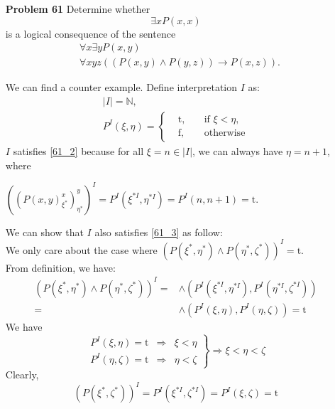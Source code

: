 \begin{enumerate}
\item[\textbf{Problem 61}]  Determine whether 
\begin{equation}
      \label{61_1}
      \exists x P(x, x) 
\end{equation}
is a logical consequence of the sentence 
\begin{eqnarray}
       \label{61_2}
       &\forall x \exists y P(x, y)\\
       \label{61_3}
       & \forall xyz((P(x, y) \wedge P(y,z)) \rightarrow P(x, z)). 
\end{eqnarray}

$~$\\
We can find a counter example. Define interpretation $I$ as:
\begin{equation*}
\begin{gathered}
|I| = \mathbb{N}, \\
P^I(\xi, \eta) = 
\left\{
        \begin{array}{ccc}      
        &\mathrm{t}, \quad &\text{if }  \xi < \eta, \\
        &\mathrm{f}, \quad &\text{otherwise}
        \end{array}\right.     
\end{gathered}
\end{equation*} 
$I$ satisfies \eqref{61_2} because for all $\xi = n \in |I|$, we can always have $\eta = n + 1$, where \begin{center}
$((P(x, y)_{\xi^*}^x)_{\eta^*}^y)^I  = P^I(\xi^{*I}, \eta^{*I}) = P^I(n, n + 1) = \mathrm{t}$. 
\end{center}

We can show that $I$ also satisfies \eqref{61_3} as follow: \\
We only care about the case where 
$(P(\xi^*, \eta^*) \wedge P(\eta^*, \zeta^*))^I = \mathrm{t}$. \\
From definition, we have:
\begin{eqnarray*}
(P(\xi^*, \eta^*) \wedge P(\eta^*, \zeta^*))^I  
                           = & \wedge (P^I(\xi^{*I}, \eta^{*I}),  P^I(\eta^{*I}, \zeta^{*I}))\\
                           =  & \wedge (P^I(\xi, \eta),  P^I(\eta, \zeta)) = \mathrm{t}
\end{eqnarray*}
We have
\begin{equation*}
\left.
        \begin{array}{ccc}      
        P^I(\xi, \eta) = \mathrm{t} &  \Rightarrow  &  \xi < \eta  \\
        P^I(\eta, \zeta) = \mathrm{t} &  \Rightarrow  &  \eta < \zeta 
        \end{array}\right\} \Rightarrow
            \xi < \eta < \zeta  
\end{equation*}
Clearly, 
\begin{equation*}
(P(\xi^*, \zeta^*))^I = P^I(\xi^{*I}, \zeta^{*I}) = P^I(\xi, \zeta) = \mathrm{t}
\end{equation*}


\end{enumerate}
